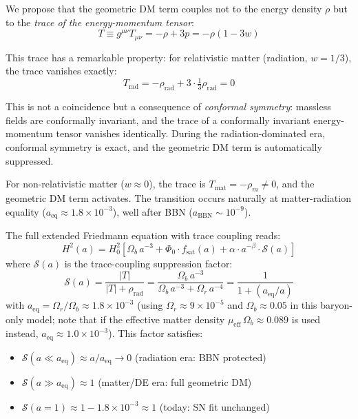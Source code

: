 \documentclass[aps,prd,twocolumn,superscriptaddress,nofootinbib,floatfix]{revtex4-2}
\begin{document}
We propose that the geometric DM term couples not to the energy density $\rho$ but to the \textit{trace of the energy-momentum tensor}:
\begin{equation}
T \equiv g^{\mu\nu} T_{\mu\nu} = -\rho + 3p = -\rho(1 - 3w)
\end{equation}

This trace has a remarkable property: for relativistic matter (radiation, $w = 1/3$), the trace vanishes exactly:
\begin{equation}
T_{\mathrm{rad}} = -\rho_{\mathrm{rad}} + 3 \cdot \tfrac{1}{3}\rho_{\mathrm{rad}} = 0
\end{equation}

This is not a coincidence but a consequence of \textit{conformal symmetry}: massless fields are conformally invariant, and the trace of a conformally invariant energy-momentum tensor vanishes identically. During the radiation-dominated era, conformal symmetry is exact, and the geometric DM term is automatically suppressed.

For non-relativistic matter ($w \approx 0$), the trace is $T_{\mathrm{mat}} = -\rho_m \neq 0$, and the geometric DM term activates. The transition occurs naturally at matter-radiation equality ($a_{\mathrm{eq}} \approx 1.8 \times 10^{-3}$), well after BBN ($a_{\mathrm{BBN}} \sim 10^{-9}$).

The full extended Friedmann equation with trace coupling reads:
\begin{equation}
H^2(a) = H_0^2 \left[\Omega_b\,a^{-3} + \Phi_0 \cdot f_{\mathrm{sat}}(a) + \alpha \cdot a^{-\beta} \cdot \mathcal{S}(a)\right]
\label{eq:extended_cfm_trace}
\end{equation}
where $\mathcal{S}(a)$ is the trace-coupling suppression factor:
\begin{equation}
\mathcal{S}(a) = \frac{|T|}{|T| + \rho_{\mathrm{rad}}} = \frac{\Omega_b\,a^{-3}}{\Omega_b\,a^{-3} + \Omega_r\,a^{-4}}
= \frac{1}{1 + (a_{\mathrm{eq}}/a)}
\label{eq:suppression}
\end{equation}
with $a_{\mathrm{eq}} = \Omega_r/\Omega_b \approx 1.8 \times 10^{-3}$ (using $\Omega_r \approx 9 \times 10^{-5}$ and $\Omega_b \approx 0.05$ in this baryon-only model; note that if the effective matter density $\mu_{\mathrm{eff}}\,\Omega_b \approx 0.089$ is used instead, $a_{\mathrm{eq}} \approx 1.0 \times 10^{-3}$). This factor satisfies:
\begin{itemize}
\item $\mathcal{S}(a \ll a_{\mathrm{eq}}) \approx a/a_{\mathrm{eq}} \to 0$ \quad (radiation era: BBN protected)
\item $\mathcal{S}(a \gg a_{\mathrm{eq}}) \approx 1$ \quad (matter/DE era: full geometric DM)
\item $\mathcal{S}(a = 1) \approx 1 - 1.8\times10^{-3} \approx 1$ \quad (today: SN fit unchanged)
\end{itemize}
\end{document}
